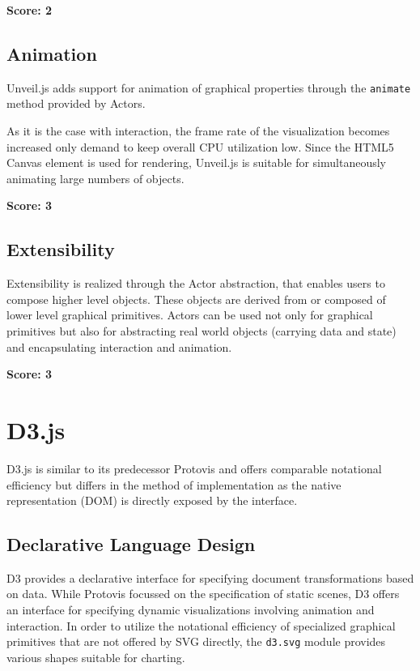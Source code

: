 \SuperPar \textbf{Score: 2}

\subsection{Animation}

Unveil.js adds support for animation of graphical properties through the \texttt{animate} method provided by Actors. 

As it is the case with interaction, the frame rate of the visualization becomes increased only demand to keep overall CPU utilization low. Since the HTML5 Canvas element is used for rendering, Unveil.js is suitable for simultaneously animating large numbers of objects.

\SuperPar \textbf{Score: 3}

\subsection{Extensibility}

Extensibility is realized through the Actor abstraction, that enables users to compose higher level objects. These objects are derived from or composed of lower level graphical primitives. Actors can be used not only for graphical primitives but also for abstracting real world objects (carrying data and state) and encapsulating interaction and animation.

\SuperPar \textbf{Score: 3}


\section{D3.js}

D3.js is similar to its predecessor Protovis and offers comparable notational efficiency but differs in the method of implementation as the native representation (DOM) is directly exposed by the interface.

\subsection{Declarative Language Design}

D3 provides a declarative interface for specifying document transformations based on data. While Protovis focussed on the specification of static scenes, D3 offers an interface for specifying dynamic visualizations involving animation and interaction. In order to utilize the notational efficiency of specialized graphical primitives that are not offered by SVG directly, the \texttt{d3.svg} module provides various shapes suitable for charting. 

